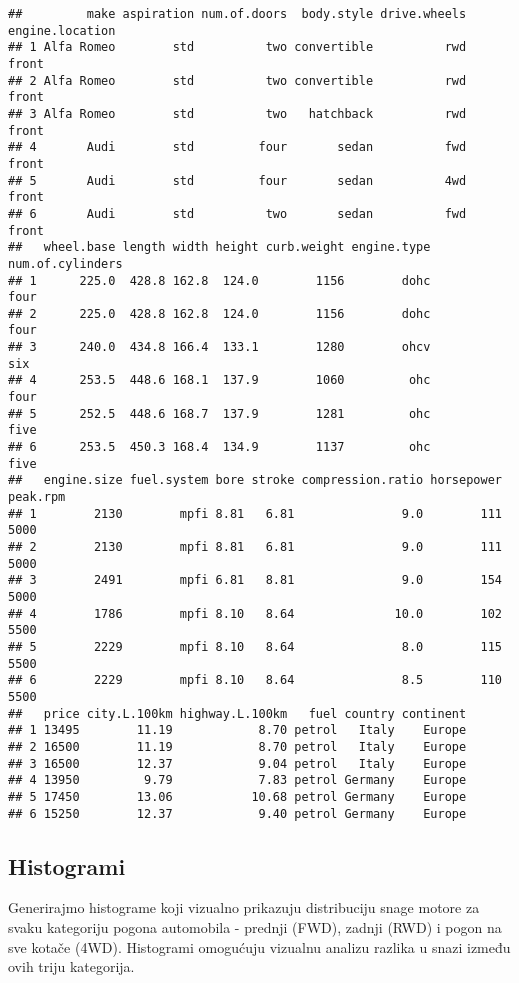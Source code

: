 \documentclass[
]{article}
\begin{document}
\begin{verbatim}
##         make aspiration num.of.doors  body.style drive.wheels engine.location
## 1 Alfa Romeo        std          two convertible          rwd           front
## 2 Alfa Romeo        std          two convertible          rwd           front
## 3 Alfa Romeo        std          two   hatchback          rwd           front
## 4       Audi        std         four       sedan          fwd           front
## 5       Audi        std         four       sedan          4wd           front
## 6       Audi        std          two       sedan          fwd           front
##   wheel.base length width height curb.weight engine.type num.of.cylinders
## 1      225.0  428.8 162.8  124.0        1156        dohc             four
## 2      225.0  428.8 162.8  124.0        1156        dohc             four
## 3      240.0  434.8 166.4  133.1        1280        ohcv              six
## 4      253.5  448.6 168.1  137.9        1060         ohc             four
## 5      252.5  448.6 168.7  137.9        1281         ohc             five
## 6      253.5  450.3 168.4  134.9        1137         ohc             five
##   engine.size fuel.system bore stroke compression.ratio horsepower peak.rpm
## 1        2130        mpfi 8.81   6.81               9.0        111     5000
## 2        2130        mpfi 8.81   6.81               9.0        111     5000
## 3        2491        mpfi 6.81   8.81               9.0        154     5000
## 4        1786        mpfi 8.10   8.64              10.0        102     5500
## 5        2229        mpfi 8.10   8.64               8.0        115     5500
## 6        2229        mpfi 8.10   8.64               8.5        110     5500
##   price city.L.100km highway.L.100km   fuel country continent
## 1 13495        11.19            8.70 petrol   Italy    Europe
## 2 16500        11.19            8.70 petrol   Italy    Europe
## 3 16500        12.37            9.04 petrol   Italy    Europe
## 4 13950         9.79            7.83 petrol Germany    Europe
## 5 17450        13.06           10.68 petrol Germany    Europe
## 6 15250        12.37            9.40 petrol Germany    Europe
\end{verbatim}

\subsection{Histogrami}\label{histogrami}

Generirajmo histograme koji vizualno prikazuju distribuciju snage motore
za svaku kategoriju pogona automobila - prednji (FWD), zadnji (RWD) i
pogon na sve kotače (4WD). Histogrami omogućuju vizualnu analizu razlika
u snazi između ovih triju kategorija.
\end{document}
